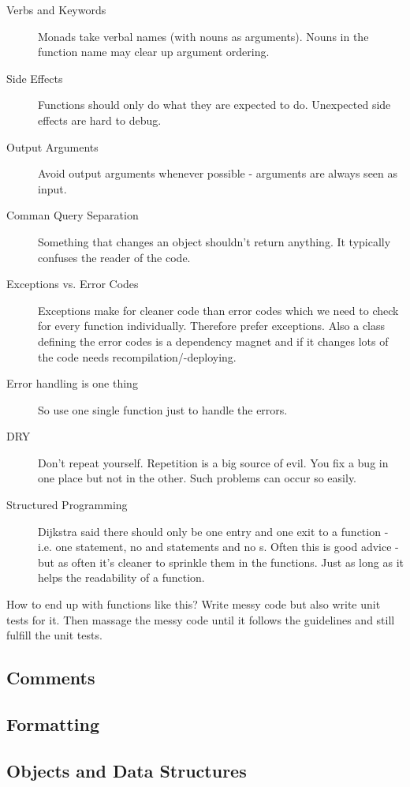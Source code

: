 \documentclass[a4paper, twocolumn]{article}
\newcommand{\code}[1]{\texttt{\color{black}{#1}}}
\begin{document}
\begin{description}
	\item[Verbs and Keywords] Monads take verbal names (with nouns as arguments). Nouns in the function name may clear up argument ordering.
	\item[Side Effects] Functions should only do what they are expected to do. Unexpected side effects are hard to debug.
	\item[Output Arguments] Avoid output arguments whenever possible - arguments are always seen as input.
	\item[Comman Query Separation] Something that changes an object shouldn't return anything. It typically confuses the reader of the code.
	\item[Exceptions vs. Error Codes] Exceptions make for cleaner code than error codes which we need to check for every function individually. Therefore prefer exceptions. Also a class defining the error codes is a dependency magnet and if it changes lots of the code needs recompilation/-deploying.
	\item[Error handling is one thing] So use one single function just to handle the errors.
	\item[DRY] Don't repeat yourself. Repetition is a big source of evil. You fix a bug in one place but not in the other. Such problems can occur so easily.
	\item[Structured Programming] Dijkstra said there should only be one entry and one exit to a function - i.e. one \code{return} statement, no \code{break} and \code{continue} statements and no \code{goto}s. Often this is good advice - but as often it's cleaner to sprinkle them in the functions. Just as long as it helps the readability of a function.
\end{description}
How to end up with functions like this? Write messy code but also write unit tests for it. Then massage the messy code until it follows the guidelines and still fulfill the unit tests.

\subsection{Comments}

\subsection{Formatting}

\subsection{Objects and Data Structures}
\end{document}
